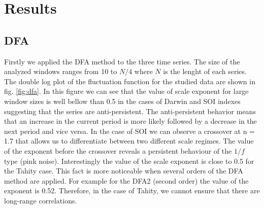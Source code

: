 \documentclass[onecolumn, preprint,aps,amsmath, amssymb, superscriptaddress]{revtex4}
\begin{document}
\section{Results}
\label{resultados}

\subsection{DFA}
\label{results_dfa}


Firstly we applied the DFA method to the three time series. The size of the analyzed windows ranges from 10 to $N/4$ where $N$ is the lenght of each series. The double log plot of the fluctuation function for the studied data are shown in fig. \ref{fig:dfa}. In this figure we can see that the value of scale exponent for large window sizes is well bellow than 0.5 in the cases of Darwin and SOI indexes suggesting that the series are anti-persistent. The anti-persistent behavior means that an increase in the current period is more likely followed by a decrease in the next period and vice versa. In the case of SOI we can observe a crossover at n = 1.7 that allows us to differentiate between two different scale regimes. The value of the exponent before the crossover reveals a persistent behaviour of the $1/f$ type (pink noise). Interestingly the value of the scale exponent is close to 0.5 for the Tahity case. This fact is more noticeable when several orders of the DFA method are applied. For example for the DFA2 (second order) the value of the exponent is 0.52. Therefore, in the case of Tahity, we cannot ensure that there are long-range correlations. 
\end{document}
